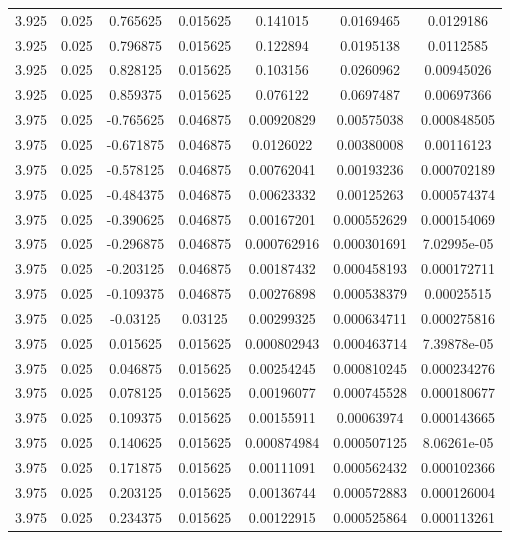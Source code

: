 \begin{table}[bh]
\begin{center}
{\begin{tabular}{ccccccc}
3.925	 & 0.025 & 	0.765625	 & 0.015625	 & 0.141015	 & 0.0169465	 & 0.0129186 \\ 
3.925	 & 0.025 & 	0.796875	 & 0.015625	 & 0.122894	 & 0.0195138	 & 0.0112585 \\ 
3.925	 & 0.025 & 	0.828125	 & 0.015625	 & 0.103156	 & 0.0260962	 & 0.00945026 \\ 
3.925	 & 0.025 & 	0.859375	 & 0.015625	 & 0.076122	 & 0.0697487	 & 0.00697366 \\ 
3.975	 & 0.025 & 	-0.765625	 & 0.046875	 & 0.00920829	 & 0.00575038	 & 0.000848505 \\ 
3.975	 & 0.025 & 	-0.671875	 & 0.046875	 & 0.0126022	 & 0.00380008	 & 0.00116123 \\ 
3.975	 & 0.025 & 	-0.578125	 & 0.046875	 & 0.00762041	 & 0.00193236	 & 0.000702189 \\ 
3.975	 & 0.025 & 	-0.484375	 & 0.046875	 & 0.00623332	 & 0.00125263	 & 0.000574374 \\ 
3.975	 & 0.025 & 	-0.390625	 & 0.046875	 & 0.00167201	 & 0.000552629	 & 0.000154069 \\ 
3.975	 & 0.025 & 	-0.296875	 & 0.046875	 & 0.000762916	 & 0.000301691	 & 7.02995e-05 \\ 
3.975	 & 0.025 & 	-0.203125	 & 0.046875	 & 0.00187432	 & 0.000458193	 & 0.000172711 \\ 
3.975	 & 0.025 & 	-0.109375	 & 0.046875	 & 0.00276898	 & 0.000538379	 & 0.00025515 \\ 
3.975	 & 0.025 & 	-0.03125	 & 0.03125	 & 0.00299325	 & 0.000634711	 & 0.000275816 \\ 
3.975	 & 0.025 & 	0.015625	 & 0.015625	 & 0.000802943	 & 0.000463714	 & 7.39878e-05 \\ 
3.975	 & 0.025 & 	0.046875	 & 0.015625	 & 0.00254245	 & 0.000810245	 & 0.000234276 \\ 
3.975	 & 0.025 & 	0.078125	 & 0.015625	 & 0.00196077	 & 0.000745528	 & 0.000180677 \\ 
3.975	 & 0.025 & 	0.109375	 & 0.015625	 & 0.00155911	 & 0.00063974	 & 0.000143665 \\ 
3.975	 & 0.025 & 	0.140625	 & 0.015625	 & 0.000874984	 & 0.000507125	 & 8.06261e-05 \\ 
3.975	 & 0.025 & 	0.171875	 & 0.015625	 & 0.00111091	 & 0.000562432	 & 0.000102366 \\ 
3.975	 & 0.025 & 	0.203125	 & 0.015625	 & 0.00136744	 & 0.000572883	 & 0.000126004 \\ 
3.975	 & 0.025 & 	0.234375	 & 0.015625	 & 0.00122915	 & 0.000525864	 & 0.000113261 \\ 

\end{tabular}}
\end{center}
\end{table}
